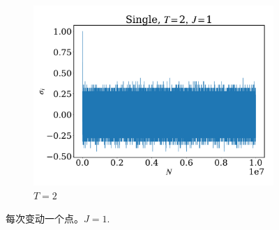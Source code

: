 \documentclass[12pt]{article}
\begin{document}
\begin{figure}
\begin{subfigure}[b]{0.49\textwidth}
		\includegraphics[width=\textwidth]{fig1DJ1N1e7/sig_s_T2J1.pdf}
		\caption{$T=2$}
	\end{subfigure}
	\caption{每次变动一个点。$J=1$.}
	\label{fig:Es}
\end{figure}
\end{document}

